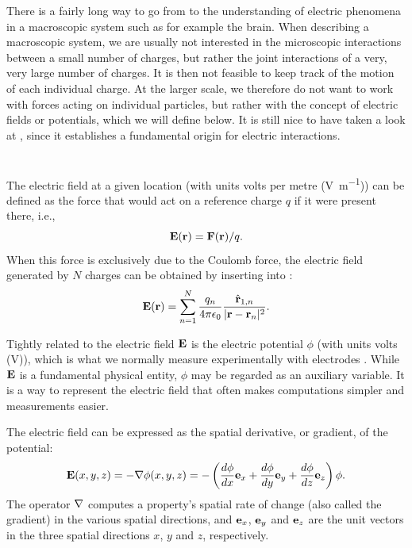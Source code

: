 There is a fairly long way to go from  to the understanding of electric phenomena in a macroscopic system such as for example the brain. When describing a macroscopic system, we are usually not interested in the microscopic interactions between a small number of charges, but rather the joint interactions of a very, very large number of charges. It is then not feasible to keep track of the motion of each individual charge. At the larger scale, we therefore do not want to work with forces acting on individual particles, but rather with the concept of electric fields or potentials, which we will define below. It is still nice to have taken a look at , since it establishes a fundamental origin for electric interactions.


\section{}
\label{sec:Basics:Fields} 
The electric field at a given location (with units volts per metre (\si{\volt\per\metre})) can be defined as the force that would act on a reference charge $q$ if it were present there, i.e.,
\begin{equation}
{\bf E}({\bf r}) = {\bf F}({\bf r})/q.
\label{eq:Basics:E}
\end{equation}
When this force is exclusively due to the Coulomb force, the electric field generated by $N$ charges can be obtained by inserting  into :
\begin{equation}
{\bf E}({\bf r}) = \sum_{n=1}^{N}  \frac{q_n}{4\pi \epsilon_0} \frac{\hat{{\bf r}}_{1,n}}{|{\bf r}-{\bf r}_n|^2}.
\label{eq:Basics:CoulombEN}
\end{equation}

Tightly related to the electric field ${\bf E}$ is the electric potential $\phi$ (with units volts (\si{\volt})), which is what we normally measure experimentally with electrodes . While ${\bf E}$ is a fundamental physical entity, $\phi$ may be regarded as an auxiliary variable. It is a way to represent the electric field that often makes computations simpler and measurements easier.

The electric field can be expressed as the spatial derivative, or gradient, of the potential:
\begin{equation}
{\bf E}(x,y,z) = - {\bf \nabla} \phi(x,y,z) = - \left(\frac{d\phi}{dx} {\bf e}_x  + \frac{d\phi}{dy} {\bf e}_y + \frac{d\phi}{dz} {\bf e}_z \right) \phi.
\label{eq:Basics:EV}
\end{equation}
The operator ${\bf \nabla}$ computes a property's spatial rate of change (also called the gradient) in the various spatial directions, and ${\bf e}_x$, ${\bf e}_y$ and  ${\bf e}_z$ are the unit vectors in the three spatial directions $x$, $y$ and $z$, respectively.

